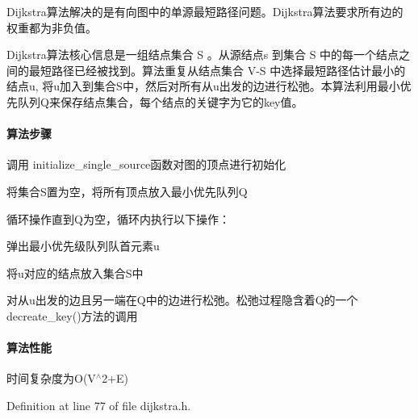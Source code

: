 Dijkstra算法解决的是有向图中的单源最短路径问题。\+Dijkstra算法要求所有边的权重都为非负值。

Dijkstra算法核心信息是一组结点集合 S 。从源结点s 到集合 S 中的每一个结点之间的最短路径已经被找到。算法重复从结点集合 V-\/\+S 中选择最短路径估计最小的结点u, 将u加入到集合\+S中，然后对所有从u出发的边进行松弛。本算法利用最小优先队列\+Q来保存结点集合，每个结点的关键字为它的key值。

\paragraph*{算法步骤}


\begin{DoxyItemize}
\item 调用 {\ttfamily initialize\+\_\+single\+\_\+source}函数对图的顶点进行初始化
\item 将集合\+S置为空，将所有顶点放入最小优先队列\+Q
\item 循环操作直到\+Q为空，循环内执行以下操作：
\begin{DoxyItemize}
\item 弹出最小优先级队列队首元素u
\item 将u对应的结点放入集合\+S中
\item 对从u出发的边且另一端在\+Q中的边进行松弛。松弛过程隐含着\+Q的一个{\ttfamily decreate\+\_\+key()}方法的调用
\end{DoxyItemize}
\end{DoxyItemize}

\paragraph*{算法性能}

时间复杂度为\+O(V$^\wedge$2+\+E) 

Definition at line 77 of file dijkstra.\+h.

\hypertarget{namespace_introduction_to_algorithm_1_1_graph_algorithm_a2ae42c12c93664d94b5a6f9980fe8540}{}
